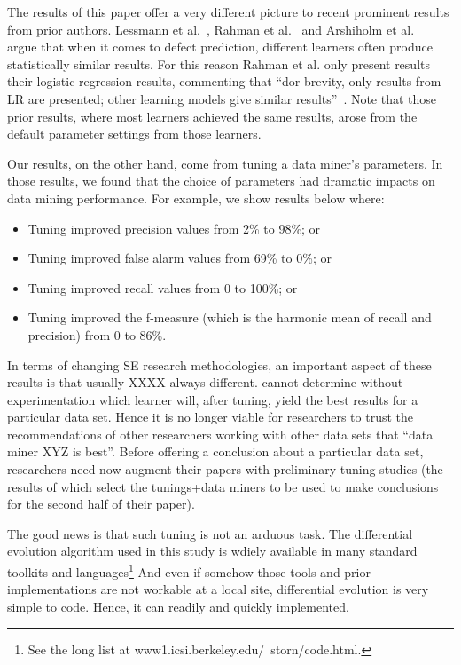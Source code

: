 \documentclass{sig-alternative}
\newcommand{\bi}{\begin{itemize}[leftmargin=0.4cm]}
\newcommand{\ei}{\end{itemize}}
\begin{document}
The results of this paper offer a very different picture  to recent prominent results from prior authors.
Lessmann et al.~\cite{lessmann2008benchmarking}, Rahman et al.~\cite{rahman2013how} and Arshiholm et al.~\cite{arisholm06} argue that when it comes to defect prediction, different learners often
produce statistically similar results. For this reason  Rahman et al. only present results their logistic
regression results, commenting that ``dor brevity, only results from LR are
presented; other learning models give similar results''~\cite{rahman2013how}. Note that those prior results,
where most learners achieved the same results, arose from the default parameter settings from those learners.

Our results, on the other hand, come from tuning a data miner's parameters. In those results,
we found that the choice of parameters had dramatic impacts on data mining performance.
For example, we show results below where:   
\bi 
\item 
Tuning improved precision values from  2\% to 98\%; or
\item 
Tuning improved false alarm values from 69\% to 0\%; or
\item 
Tuning improved recall values from 0 to 100\%; or
\item 
Tuning improved the f-measure (which is the harmonic mean of recall and precision) from 0 to 86\%.
\ei   
In terms of changing SE research methodologies, an important aspect of these results is that usually XXXX always different. cannot determine without experimentation which learner will, after tuning, yield the best results for a particular data set. Hence it is no longer viable for researchers to trust the recommendations 
of other researchers working with other data sets that ``data miner XYZ is best''. Before
offering a conclusion about a particular data set, researchers need now augment  their 
papers with preliminary tuning studies (the results of which select the tunings+data miners to be used
to make conclusions for the second half of their paper).

The good news is that such tuning is not an arduous task. The differential evolution algorithm 
used in this study is wdiely available in many standard  toolkits and languages\footnote{See the long list at
www1.icsi.berkeley.edu/~storn/code.html.}
And even if somehow those tools and prior implementations are not workable at a local site, 
differential evolution is very simple to code. Hence, it can readily and quickly implemented.
 
\end{document}
